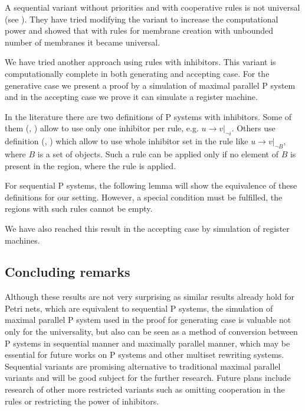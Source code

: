  A sequential variant without priorities and with cooperative rules is not universal (see \cite{Ibarra04dang}). They have tried modifying the variant to increase the computational power and showed that with rules for membrane creation with unbounded number of membranes it became universal.

We have tried another approach using rules with inhibitors. This variant is computationally complete in both generating and accepting case. For the generative case we present a proof by a simulation of maximal parallel P system and in the accepting case we prove it can simulate a register machine.

In the literature there are two definitions of  P systems with inhibitors.
Some of them (\cite{Ionescu:jucs_10_5:on_p_systems_with}, \cite{Sburlan05dragos}) allow to use only one inhibitor per rule, e.g. $u\rightarrow v|_{\neg i}$.
Others use definition (\cite{Agrigoroaiei:2010:Dissolution}, \cite{Sburlan:2006:FurtherResultsPromotersInhibitors}) which allow to use whole inhibitor set in the rule like $u\rightarrow v|_{\neg B}$, where $B$ is a set of objects. Such a rule can be applied only if no element of $B$ is present in the region, where the rule is applied.

For sequential P systems, the following lemma will show the equivalence of these definitions for our setting. However, a special condition must be fulfilled, the regions with such rules cannot be empty.



We have also reached this result in the accepting case by simulation of  register machines.



\subsection{Concluding remarks} %
\label{sub:concluding_remarks_of_inhibitors}

Although these results are not very surprising as similar results already hold for Petri nets, which are equivalent to sequential P systems, the simulation of maximal parallel P system used in the proof for generating case is valuable not only for the universality, but also can be seen as a method of conversion between P systems in sequential manner and maximally parallel manner, which may be essential for future works on P systems and other multiset rewriting systems. Sequential variants are promising alternative to traditional maximal parallel variants and will be good subject for the further research. Future plans include research of other more restricted variants such as omitting cooperation in the rules or restricting the power of inhibitors.


